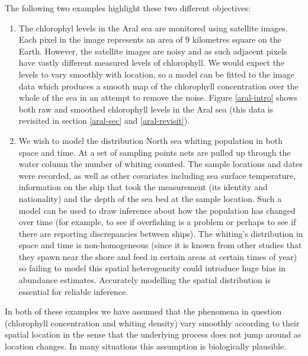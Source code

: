 The following two examples highlight these two different objectives:
\begin{enumerate}
\item The chlorophyl levels in the Aral sea are monitored using satellite images. Each pixel in the image represents an area of 9 kilometres square on the Earth. However, the satellite images are noisy and as such adjacent pixels have vastly different measured levels of chlorophyll. We would expect the levels to vary smoothly with location, so a model can be fitted to the image data which produces a smooth map of the chlorophyll concentration over the whole of the sea in an attempt to remove the noise. Figure \ref{aral-intro} shows both raw and smoothed chlorophyll levels in the Aral sea (this data is revisited in section \ref{aral-sec} and \ref{aral-revisit}).
\item We wish to model the distribution North sea whiting population in both space and time. At a set of sampling points nets are pulled up through the water column the number of whiting counted. The sample locations and dates were recorded, as well as other covariates including sea surface temperature, information on the ship that took the measurement (its identity and nationality) and the depth of the sea bed at the sample location. Such a model can be used to draw inference about how the population has changed over time (for example, to see if overfishing is a problem or perhaps to see if there are reporting discrepancies between ships). The whiting's distribution in space and time is non-homogeneous (since it is known from other studies that they spawn near the shore and feed in certain areas at certain times of year) so failing to model this spatial heterogeneity could introduce huge bias in abundance estimates. Accurately modelling the spatial distribution is essential for reliable inference.
\end{enumerate}
In both of these examples we have assumed that the phenomena in question (chlorophyll concentration and whiting density) vary smoothly according to their spatial location in the sense that the underlying process does not jump around as location changes. In many situations this assumption is biologically plausible.

